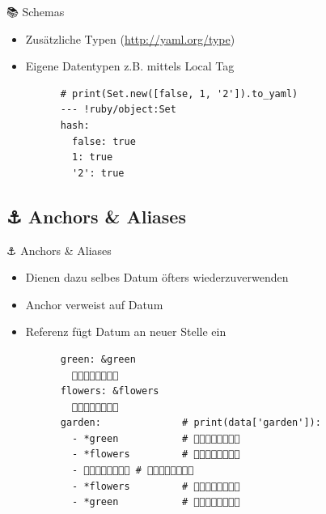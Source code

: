 \documentclass{beamer}
\newcommand{\code}[1]{
  \codebox{\texttt|#1|}
}
\begin{document}
\begin{frame}{📚 Schemas}
  \newpage
  \begin{itemize}
    \item Zusätzliche Typen (\textcolor{orange}{\url{http://yaml.org/type}})
    \item Eigene Datentypen z.B. mittels Local Tag~\\[0.5cm]
    \begin{verbatim}
      # print(Set.new([false, 1, '2']).to_yaml)
      --- !ruby/object:Set
      hash:
        false: true
        1: true
        '2': true
    \end{verbatim}
  \end{itemize}
\end{frame}

\subsection{⚓️ Anchors \& Aliases}

\begin{frame}[fragile]{⚓️ Anchors \& Aliases}
  \begin{itemize}
    \item Dienen dazu selbes Datum öfters wiederzuverwenden
    \item Anchor \code{&name} verweist auf Datum
    \item Referenz \code{*name} fügt Datum an neuer Stelle ein~\\[0.5cm]
    \begin{verbatim}
      green: &green
        🌳🌱🌿🌱🌿🌱🌿🌳
      flowers: &flowers
        🌳🌸🌼🌻🌺🌼🌸🌳
      garden:              # print(data['garden']):
        - *green           # 🌳🌱🌿🌱🌿🌱🌿🌳
        - *flowers         # 🌳🌸🌼🌻🌺🌼🌸🌳
        - 🌳🌱🐞🌱🌱🐛🌱🌳 # 🌳🌱🐞🌱🌱🐛🌱🌳
        - *flowers         # 🌳🌸🌼🌻🌺🌼🌸🌳
        - *green           # 🌳🌱🌿🌱🌿🌱🌿🌳
    \end{verbatim}
  \end{itemize}
\end{frame}
\end{document}
